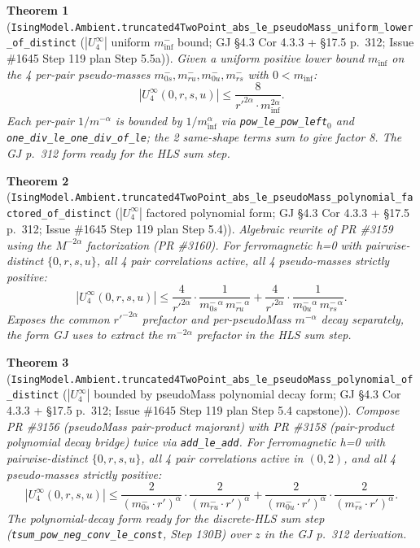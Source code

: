 \documentclass[a4paper,11pt]{article}
\newtheorem{theorem}{Theorem}
\begin{document}
\begin{theorem}[\texttt{IsingModel.Ambient.truncated4TwoPoint\_abs\_le\_pseudoMass\_uniform\_lower\_of\_distinct}
($|U_4^\infty|$ uniform $m^-_{\mathrm{inf}}$ bound; GJ \S4.3 Cor 4.3.3 + \S17.5 p.~312; Issue \#1645
Step 119 plan Step 5.5a)]
Given a uniform positive lower bound $m_{\mathrm{inf}}$ on the 4 per-pair pseudo-masses
$m^-_{0s}, m^-_{ru}, m^-_{0u}, m^-_{rs}$ with $0 < m_{\mathrm{inf}}$:
\[
  |U_4^\infty(0, r, s, u)| \le \frac{8}{r'^{2\alpha}\cdot m_{\mathrm{inf}}^{2\alpha}}.
\]
Each per-pair $1/m^{-\alpha}$ is bounded by $1/m_{\mathrm{inf}}^\alpha$ via
\texttt{pow\_le\_pow\_left}$_0$ and \texttt{one\_div\_le\_one\_div\_of\_le}; the 2
same-shape terms sum to give factor 8. The GJ p.~312 form ready for the HLS sum step.
\end{theorem}

\begin{theorem}[\texttt{IsingModel.Ambient.truncated4TwoPoint\_abs\_le\_pseudoMass\_polynomial\_factored\_of\_distinct}
($|U_4^\infty|$ factored polynomial form; GJ \S4.3 Cor 4.3.3 + \S17.5 p.~312; Issue \#1645
Step 119 plan Step 5.4)]
Algebraic rewrite of PR \#3159 using the $M^{-2\alpha}$ factorization (PR \#3160). For
ferromagnetic h=0 with pairwise-distinct $\{0, r, s, u\}$, all 4 pair correlations active,
all 4 pseudo-masses strictly positive:
\[
  |U_4^\infty(0, r, s, u)|
    \le \frac{4}{r'^{2\alpha}}\cdot\frac{1}{m^-_{0s}{}^{\alpha}\,m^-_{ru}{}^{\alpha}}
      + \frac{4}{r'^{2\alpha}}\cdot\frac{1}{m^-_{0u}{}^{\alpha}\,m^-_{rs}{}^{\alpha}}.
\]
Exposes the common $r'^{-2\alpha}$ prefactor and per-pseudoMass $m^{-\alpha}$ decay
separately, the form GJ uses to extract the $m^{-2\alpha}$ prefactor in the HLS sum step.
\end{theorem}

\begin{theorem}[\texttt{IsingModel.Ambient.truncated4TwoPoint\_abs\_le\_pseudoMass\_polynomial\_of\_distinct}
($|U_4^\infty|$ bounded by pseudoMass polynomial decay form; GJ \S4.3 Cor 4.3.3 + \S17.5 p.~312;
Issue \#1645 Step 119 plan Step 5.4 capstone)]
Compose PR \#3156 (pseudoMass pair-product majorant) with PR \#3158 (pair-product polynomial
decay bridge) twice via \texttt{add\_le\_add}. For ferromagnetic h=0 with pairwise-distinct
$\{0, r, s, u\}$, all 4 pair correlations active in $(0, 2)$, and all 4 pseudo-masses
strictly positive:
\[
  |U_4^\infty(0, r, s, u)|
    \le \frac{2}{(m^-_{0s}\cdot r')^\alpha}\cdot\frac{2}{(m^-_{ru}\cdot r')^\alpha}
      + \frac{2}{(m^-_{0u}\cdot r')^\alpha}\cdot\frac{2}{(m^-_{rs}\cdot r')^\alpha}.
\]
The polynomial-decay form ready for the discrete-HLS sum step
(\texttt{tsum\_pow\_neg\_conv\_le\_const}, Step 130B) over $z$ in the GJ p.~312 derivation.
\end{theorem}
\end{document}
